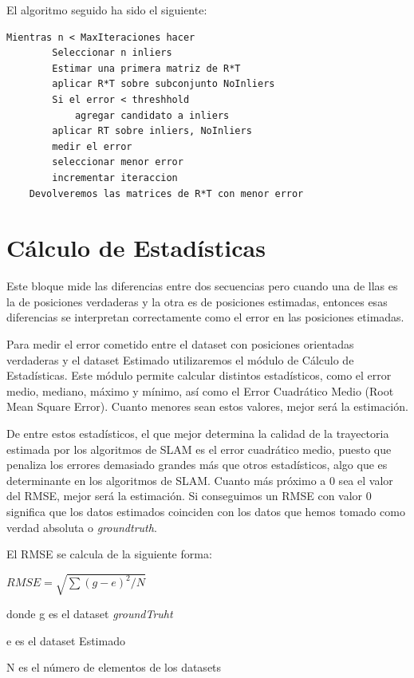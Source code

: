 El algoritmo seguido ha sido el siguiente:
    \begin{lstlisting}[frame=single]
	Mientras n < MaxIteraciones hacer
		Seleccionar n inliers
		Estimar una primera matriz de R*T
		aplicar R*T sobre subconjunto NoInliers
		Si el error < threshhold
			agregar candidato a inliers
		aplicar RT sobre inliers, NoInliers
		medir el error 
		seleccionar menor error
		incrementar iteraccion
	Devolveremos las matrices de R*T con menor error
	\end{lstlisting}
	        
   

\section{Cálculo de Estadísticas}

Este bloque mide las diferencias entre dos secuencias pero cuando una de llas es la de posiciones verdaderas y la otra es de posiciones estimadas, entonces esas diferencias se interpretan correctamente como el error en las posiciones etimadas.

Para medir el error cometido entre el dataset con posiciones orientadas verdaderas y el dataset Estimado utilizaremos el módulo de Cálculo de Estadísticas.
Este módulo permite calcular distintos estadísticos, como el error medio, mediano, máximo y mínimo, así como el Error Cuadrático Medio (Root Mean Square Error).
Cuanto menores sean estos valores, mejor será la estimación.

De entre estos estadísticos, el que mejor determina la calidad de la trayectoria estimada por los algoritmos de SLAM es el error cuadrático medio, puesto que penaliza los errores demasiado grandes más que otros estadísticos, algo que es determinante en los algoritmos de SLAM. Cuanto más próximo a 0 sea el valor del RMSE, mejor será la estimación. Si conseguimos un RMSE con valor 0 significa que los datos estimados coinciden con los datos que hemos tomado como verdad absoluta o \textit{groundtruth}.

El RMSE se calcula de la siguiente forma:
\begin{center}
\begin{math}
RMSE =\sqrt{\sum{( g - e)^2}/N}
\end{math}
\end{center}

donde g es el dataset \textit{groundTruht}

      e es el dataset Estimado

      N es el número de elementos de los datasets

